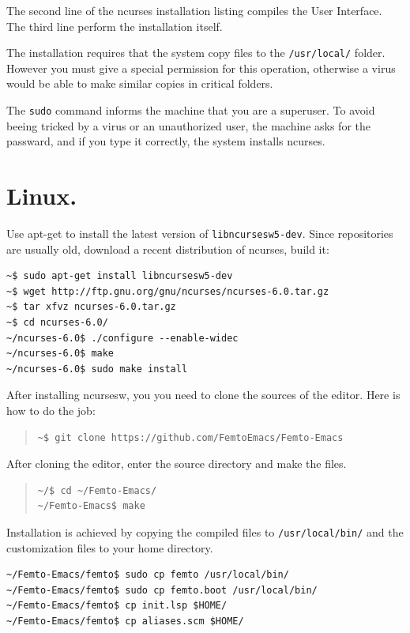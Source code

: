 \documentclass[a4paper,12pt]{book}
\begin{document}
The second line of the ncurses installation
listing compiles the User Interface.
The third line perform the installation
itself.

The installation requires that the
system copy files to the \verb|/usr/local/|
folder. However you must give a special
permission for this operation, otherwise
a virus would be able to make similar copies
in critical folders.

The \verb|sudo|
command informs the machine that you
are a superuser. To avoid beeing tricked
by a virus or an unauthorized user,
the machine asks for the passward,
and if you type it correctly,
the system installs ncurses.

\section{Linux.} Use apt-get to install the
latest version of \verb|libncursesw5-dev|.
Since repositories are usually old,
 download a recent distribution of ncurses,
build it:
\begin{verbatim}
~$ sudo apt-get install libncursesw5-dev
~$ wget http://ftp.gnu.org/gnu/ncurses/ncurses-6.0.tar.gz
~$ tar xfvz ncurses-6.0.tar.gz
~$ cd ncurses-6.0/
~/ncurses-6.0$ ./configure --enable-widec
~/ncurses-6.0$ make
~/ncurses-6.0$ sudo make install
\end{verbatim}
After installing ncursesw, you you need to
clone the sources of the editor. Here is how
to do the job:
\begin{quote}
\begin{verbatim}
~$ git clone https://github.com/FemtoEmacs/Femto-Emacs
\end{verbatim}
\end{quote}

After cloning the editor, enter the source directory
and make the files.
\begin{quote}
\begin{verbatim}
~/$ cd ~/Femto-Emacs/ 
~/Femto-Emacs$ make
\end{verbatim}
\end{quote}
Installation is achieved by copying the
compiled files to \verb|/usr/local/bin/| and
the customization files to your home directory.
\begin{verbatim}
~/Femto-Emacs/femto$ sudo cp femto /usr/local/bin/ 
~/Femto-Emacs/femto$ sudo cp femto.boot /usr/local/bin/ 
~/Femto-Emacs/femto$ cp init.lsp $HOME/ 
~/Femto-Emacs/femto$ cp aliases.scm $HOME/
\end{verbatim}
\end{document}
